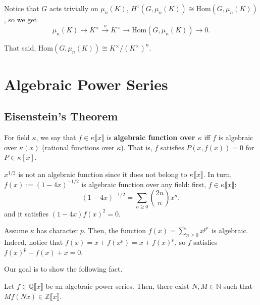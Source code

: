 \documentclass{template}
\begin{document}
Notice that $G$ acts trivially on $\mu_n(K)$, $H^1(G, \mu_n(K)) \cong
\text{Hom}(G, \mu_n(K))$, so we get
\begin{equation*}
    \mu_n(K) \to K^{\times} \xrightarrow{\nu} K^{\times} \to \text{Hom}(G, \mu_n(K)) \to 0.
\end{equation*}

That said, $\text{Hom}(G, \mu_n(K)) \cong K^{\times}/(K^{\times})^n$.

\chapter{Algebraic Power Series}

\section{Eisenstein's Theorem}

\begin{definition}
    For field $\kappa$, we say that $f \in \kappa\llbracket x \rrbracket$ is \textbf{algebraic function over $\kappa$} iff $f$ is algebraic over $\kappa(x)$ (rational functions over $\kappa$).
    That is, $f$ satisfies $P(x,f(x))=0$ for $P \in \kappa[x]$.
\end{definition}

\begin{example}
    $x^{1/2}$ is not an algebraic function since it does not belong to $\kappa\llbracket x \rrbracket$. In turn, $f(x) := (1-4x)^{-1/2}$ is algebraic function over any field: first, $f \in \kappa\llbracket x \rrbracket$:
    \begin{equation*}
        (1-4x)^{-1/2} = \sum_{n \geq 0}\binom{2n}{n}x^n,
    \end{equation*}
    and it satisfies $(1-4x)f(x)^2=0$.
\end{example}

\begin{example}
    Assume $\kappa$ has character $p$. Then, the function $f(x)=\sum_{n \geq 0}x^{p^n}$ is algebraic.
    Indeed, notice that $f(x) = x+f(x^p) = x+f(x)^p$, so $f$ satisfies $f(x)^p-f(x)+x=0$.
\end{example}

Our goal is to show the following fact.
\begin{theorem}
    Let $f \in \mathbb{Q}\llbracket x \rrbracket$ be an algebraic power series. Then, there exist $N,M \in \mathbb{N}$ such that $Mf(Nx) \in \mathbb{Z}\llbracket x\rrbracket$.
\end{theorem}
\end{document}
